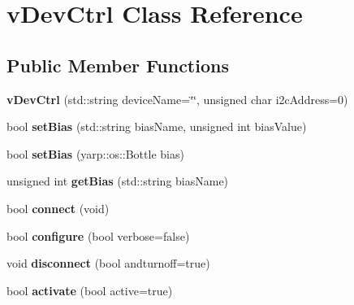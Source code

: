 \hypertarget{classvDevCtrl}{}\section{v\+Dev\+Ctrl Class Reference}
\label{classvDevCtrl}
\subsection*{Public Member Functions}
\begin{DoxyCompactItemize}
\item 
{\bfseries v\+Dev\+Ctrl} (std\+::string device\+Name=\char`\"{}\char`\"{}, unsigned char i2c\+Address=0)\hypertarget{classvDevCtrl_a28270bc81b8f37400562730649b9ea20}{}\label{classvDevCtrl_a28270bc81b8f37400562730649b9ea20}

\item 
bool {\bfseries set\+Bias} (std\+::string bias\+Name, unsigned int bias\+Value)\hypertarget{classvDevCtrl_ad7c8b642dc056c3e0475af546ed6e534}{}\label{classvDevCtrl_ad7c8b642dc056c3e0475af546ed6e534}

\item 
bool {\bfseries set\+Bias} (yarp\+::os\+::\+Bottle bias)\hypertarget{classvDevCtrl_ac95a8bc8aedcd40fa1fa8089e568390b}{}\label{classvDevCtrl_ac95a8bc8aedcd40fa1fa8089e568390b}

\item 
unsigned int {\bfseries get\+Bias} (std\+::string bias\+Name)\hypertarget{classvDevCtrl_a37baee231dd38b573c674fca0ac0024e}{}\label{classvDevCtrl_a37baee231dd38b573c674fca0ac0024e}

\item 
bool {\bfseries connect} (void)\hypertarget{classvDevCtrl_af6ccda24918a78cd5eb800c3f11c07c4}{}\label{classvDevCtrl_af6ccda24918a78cd5eb800c3f11c07c4}

\item 
bool {\bfseries configure} (bool verbose=false)\hypertarget{classvDevCtrl_a432d0c5cb40afbce3e14a685cfdd11c0}{}\label{classvDevCtrl_a432d0c5cb40afbce3e14a685cfdd11c0}

\item 
void {\bfseries disconnect} (bool andturnoff=true)\hypertarget{classvDevCtrl_a274051caa72b84acac607ebb3d7ec2e2}{}\label{classvDevCtrl_a274051caa72b84acac607ebb3d7ec2e2}

\item 
bool {\bfseries activate} (bool active=true)\hypertarget{classvDevCtrl_a737b66cec44fc2bd0ebb29dccf15838b}{}\label{classvDevCtrl_a737b66cec44fc2bd0ebb29dccf15838b}


\end{DoxyCompactItemize}
